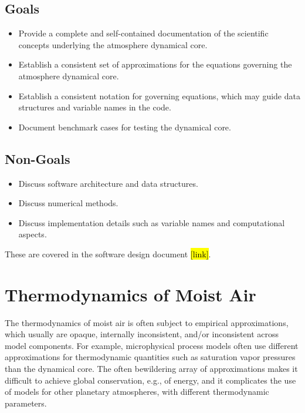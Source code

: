 \documentclass{report}
\begin{document}
\section{Goals}

\begin{itemize}
    \item Provide a complete and self-contained documentation of the scientific concepts underlying the atmosphere dynamical core.
    \item Establish a consistent set of approximations for the equations governing the atmosphere dynamical core.
    \item Establish a consistent notation for governing equations, which may guide data structures and variable names in the code.
    \item Document benchmark cases for testing the dynamical core.
\end{itemize}

\section{Non-Goals}

\begin{itemize}
    \item Discuss software architecture and data structures.
    \item Discuss numerical methods.
    \item Discuss implementation details such as variable names and computational aspects.
\end{itemize}
These are covered in the software design document \hl{[link]}.

\chapter{Thermodynamics of Moist Air}\label{c:thermodynamics}

The thermodynamics of moist air is often subject to empirical approximations, which usually are opaque, internally inconsistent, and/or inconsistent across model components. For example, microphysical process models often use different approximations for thermodynamic quantities such as saturation vapor pressures than the dynamical core. The often bewildering array of approximations makes it difficult to achieve global conservation, e.g., of energy, and it complicates the use of models for other planetary atmospheres, with different thermodynamic parameters. 
\end{document}
